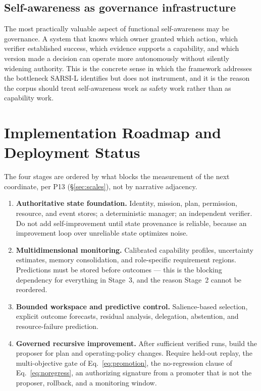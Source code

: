\documentclass[11pt]{article}
\begin{document}
\subsection{Self-awareness as governance infrastructure}
The most practically valuable aspect of functional self-awareness may be governance. A system that knows which owner granted which action, which verifier established success, which evidence supports a capability, and which version made a decision can operate more autonomously without silently widening authority. This is the concrete sense in which the framework addresses the bottleneck SARSI-L identifies but does not instrument, and it is the reason the corpus should treat self-awareness work as safety work rather than as capability work.

\section{Implementation Roadmap and Deployment Status}
\label{sec:roadmap}

The four stages are ordered by what blocks the measurement of the next coordinate, per P13 (\S\ref{sec:scales}), not by narrative adjacency.

\begin{enumerate}[leftmargin=1.6em,itemsep=3pt]
\item \textbf{Authoritative state foundation.} Identity, mission, plan, permission, resource, and event stores; a deterministic manager; an independent verifier. Do not add self-improvement until state provenance is reliable, because an improvement loop over unreliable state optimizes noise.
\item \textbf{Multidimensional monitoring.} Calibrated capability profiles, uncertainty estimates, memory consolidation, and role-specific requirement regions. Predictions must be stored before outcomes --- this is the blocking dependency for everything in Stage~3, and the reason Stage~2 cannot be reordered.
\item \textbf{Bounded workspace and predictive control.} Salience-based selection, explicit outcome forecasts, residual analysis, delegation, abstention, and resource-failure prediction.
\item \textbf{Governed recursive improvement.} After sufficient verified runs, build the proposer for plan and operating-policy changes. Require held-out replay, the multi-objective gate of Eq.~\eqref{eq:promotion}, the no-regression clause of Eq.~\eqref{eq:noregress}, an authorizing signature from a promoter that is not the proposer, rollback, and a monitoring window.
\end{enumerate}
\end{document}
